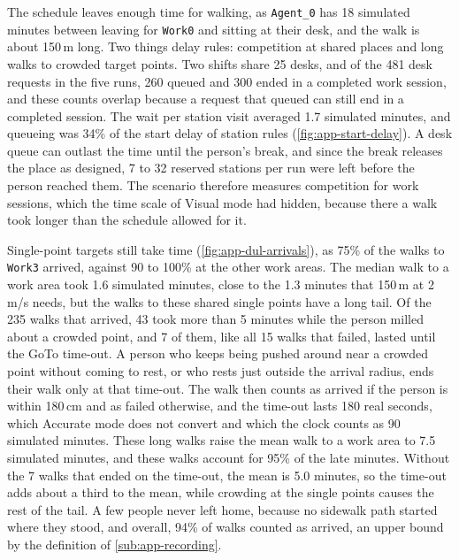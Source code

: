 The schedule leaves enough time for walking, as \texttt{Agent\_0} has 18 simulated minutes between leaving for \texttt{Work0} and sitting at their desk, and the walk is about 150\,m long. Two things delay rules: competition at shared places and long walks to crowded target points. Two shifts share 25 desks, and of the 481 desk requests in the five runs, 260 queued and 300 ended in a completed work session, and these counts overlap because a request that queued can still end in a completed session. The wait per station visit averaged 1.7 simulated minutes, and queueing was 34\% of the start delay of station rules (\cref{fig:app-start-delay}). A desk queue can outlast the time until the person's break, and since the break releases the place as designed, 7 to 32 reserved stations per run were left before the person reached them. The scenario therefore measures competition for work sessions, which the time scale of Visual mode had hidden, because there a walk took longer than the schedule allowed for it.

Single-point targets still take time (\cref{fig:app-dul-arrivals}), as 75\% of the walks to \texttt{Work3} arrived, against 90 to 100\% at the other work areas. The median walk to a work area took 1.6 simulated minutes, close to the 1.3 minutes that 150\,m at 2\,m/s needs, but the walks to these shared single points have a long tail. Of the 235 walks that arrived, 43 took more than 5 minutes while the person milled about a crowded point, and 7 of them, like all 15 walks that failed, lasted until the GoTo time-out. A person who keeps being pushed around near a crowded point without coming to rest, or who rests just outside the arrival radius, ends their walk only at that time-out. The walk then counts as arrived if the person is within 180\,cm and as failed otherwise, and the time-out lasts 180 real seconds, which Accurate mode does not convert and which the clock counts as 90 simulated minutes. These long walks raise the mean walk to a work area to 7.5 simulated minutes, and these walks account for 95\% of the late minutes. Without the 7 walks that ended on the time-out, the mean is 5.0 minutes, so the time-out adds about a third to the mean, while crowding at the single points causes the rest of the tail. A few people never left home, because no sidewalk path started where they stood, and overall, 94\% of walks counted as arrived, an upper bound by the definition of \cref{sub:app-recording}.

